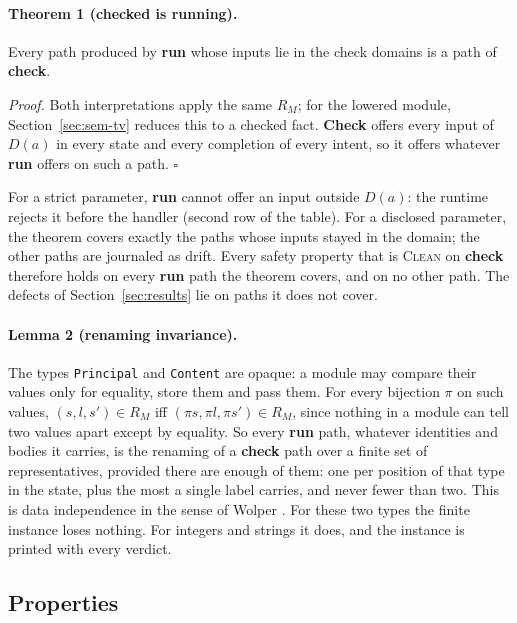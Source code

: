\documentclass[11pt]{article}
\begin{document}
\paragraph{Theorem 1 (checked is running).} Every path produced by \textbf{run} whose inputs lie in the check domains is a path of \textbf{check}.

\noindent\emph{Proof.} Both interpretations apply the same $R_M$; for the lowered module, Section~\ref{sec:sem-tv} reduces this to a checked fact. \textbf{Check} offers every input of $D(a)$ in every state and every completion of every intent, so it offers whatever \textbf{run} offers on such a path. $\square$

For a strict parameter, \textbf{run} cannot offer an input outside $D(a)$: the runtime rejects it before the handler (second row of the table). For a disclosed parameter, the theorem covers exactly the paths whose inputs stayed in the domain; the other paths are journaled as drift. Every safety property that is \textsc{Clean} on \textbf{check} therefore holds on every \textbf{run} path the theorem covers, and on no other path. The defects of Section~\ref{sec:results} lie on paths it does not cover.

\paragraph{Lemma 2 (renaming invariance).} The types \texttt{Principal} and \texttt{Content} are opaque: a module may compare their values only for equality, store them and pass them. For every bijection $\pi$ on such values, $(s, l, s') \in R_M$ iff $(\pi s, \pi l, \pi s') \in R_M$, since nothing in a module can tell two values apart except by equality. So every \textbf{run} path, whatever identities and bodies it carries, is the renaming of a \textbf{check} path over a finite set of representatives, provided there are enough of them: one per position of that type in the state, plus the most a single label carries, and never fewer than two. This is data independence in the sense of Wolper \cite{wolper1986data}. For these two types the finite instance loses nothing. For integers and strings it does, and the instance is printed with every verdict.

\subsection{Properties}
\end{document}
